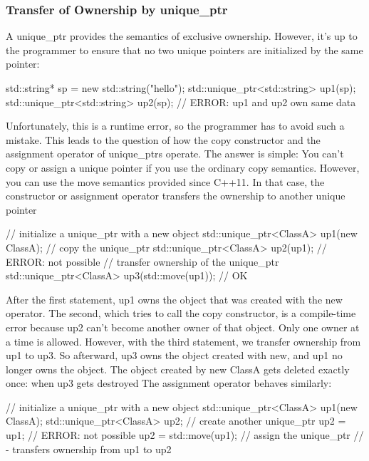 \documentclass{report}
\begin{document}
\subsubsection{Transfer of Ownership by unique\_ptr}
\bigbreak \noindent 
A unique\_ptr provides the semantics of exclusive ownership. However, it’s up to the programmer to ensure that no two unique pointers are initialized by the same pointer:
\bigbreak \noindent 
\begin{cppcode}
std::string* sp = new std::string("hello");
std::unique_ptr<std::string> up1(sp);
std::unique_ptr<std::string> up2(sp); // ERROR: up1 and up2 own same data
\end{cppcode}
\bigbreak \noindent 
Unfortunately, this is a runtime error, so the programmer has to avoid such a mistake.
\bigbreak \noindent 
This leads to the question of how the copy constructor and the assignment operator of
unique\_ptrs operate. The answer is simple: You can’t copy or assign a unique pointer if you use
the ordinary copy semantics. However, you can use the move semantics provided since C++11. In that case, the constructor or assignment operator transfers the ownership
to another unique pointer
\bigbreak \noindent 
\begin{cppcode}
    // initialize a unique_ptr with a new object
    std::unique_ptr<ClassA> up1(new ClassA);
    // copy the unique_ptr
    std::unique_ptr<ClassA> up2(up1); // ERROR: not possible
    // transfer ownership of the unique_ptr
    std::unique_ptr<ClassA> up3(std::move(up1)); // OK
\end{cppcode}
\bigbreak \noindent 
After the first statement, up1 owns the object that was created with the new operator. The second,
which tries to call the copy constructor, is a compile-time error because up2 can’t become another
owner of that object. Only one owner at a time is allowed. However, with the third statement, we
transfer ownership from up1 to up3. So afterward, up3 owns the object created with new, and up1
no longer owns the object. The object created by new ClassA gets deleted exactly once: when up3
gets destroyed
\bigbreak \noindent 
The assignment operator behaves similarly:
\bigbreak \noindent 
\begin{cppcode}
    // initialize a unique_ptr with a new object
    std::unique_ptr<ClassA> up1(new ClassA);
    std::unique_ptr<ClassA> up2; // create another unique_ptr
    up2 = up1; // ERROR: not possible
    up2 = std::move(up1); // assign the unique_ptr
    // - transfers ownership from up1 to up2
\end{cppcode}
\end{document}
